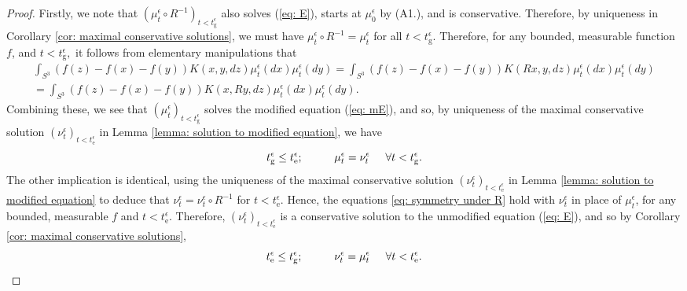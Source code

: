 \begin{proof} Firstly, we note that $( \mu^\epsilon_t \circ R^{-1})_{t<t_\mathrm{g}^\epsilon}$ also solves (\ref{eq: E}), starts at $\mu^\epsilon_0$ by (A1.), and is conservative. Therefore, by uniqueness in Corollary \ref{cor: maximal conservative solutions}, we must have $\mu^\epsilon_t \circ R^{-1}=\mu^\epsilon_t$ for all $t<t_\mathrm{g}^\epsilon.$ Therefore, for any bounded, measurable function $f$, and $t<t^\epsilon_\mathrm{g},$ it follows from elementary manipulations that
\begin{multline}\label{eq: symmetry under R}
        \int_{S^3} (f(z)-f(x)-f(y))K(x,y,dz)\mu^\epsilon_t(dx)\mu^\epsilon_t(dy)
 =  \int_{S^3} (f(z)-f(x)-f(y))K(Rx,y,dz)\mu^\epsilon_t(dx)\mu^\epsilon_t(dy) \\
 =  \int_{S^3} (f(z)-f(x)-f(y))K(x,Ry,dz)\mu^\epsilon_t(dx)\mu^\epsilon_t(dy).
\end{multline} Combining these, we see that $(\mu^\epsilon_t)_{t<t^\epsilon_\mathrm{g}}$ solves the modified equation (\ref{eq: mE}), and so, by uniqueness of the maximal conservative solution $(\nu^\epsilon_t)_{t<t_\mathrm{e}^\epsilon}$ in Lemma \ref{lemma: solution to modified equation}, we have \begin{equation}
        t^\epsilon_\mathrm{g} \leq t_\mathrm{e}^\epsilon; \hspace{1cm} \mu^\epsilon_t=\nu^\epsilon_t \hspace{0.5cm}\forall t<t^\epsilon_\mathrm{g}.
    \end{equation} The other implication is identical, using the uniqueness of the maximal conservative solution $(\nu^\epsilon_t)_{t<t_\mathrm{e}^\epsilon}$ in Lemma \ref{lemma: solution to modified equation} to deduce that $\nu^\epsilon_t= \nu^\epsilon_t\circ R^{-1}$ for $t<t_\mathrm{e}^\epsilon$. Hence, the equations \eqref{eq: symmetry under R} hold with $\nu^\epsilon_t$ in place of $\mu^\epsilon_t$, for any bounded, measurable $f$ and $t<t_\mathrm{e}^\epsilon.$ Therefore, $(\nu^\epsilon_t)_{t<t_\mathrm{e}^\epsilon}$ is a conservative solution to the unmodified equation (\ref{eq: E}), and so by Corollary \ref{cor: maximal conservative solutions}, \begin{equation}
        t_\mathrm{e}^\epsilon \leq t^\epsilon_\mathrm{g}; \hspace{1cm} \nu^\epsilon_t=\mu^\epsilon_t \hspace{0.5cm}\forall t<t_\mathrm{e}^\epsilon.
    \end{equation} \end{proof}  
    
